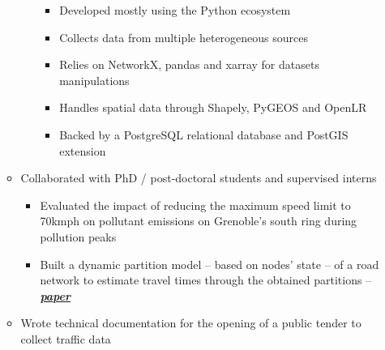 \documentclass{article}
\begin{document}
\begin{minipage}{0.8\textwidth}
\begin{flushleft}
\begin{itemize}
\begin{itemize}[leftmargin=*]
\begin{itemize}[leftmargin=*]
\begin{itemize}[leftmargin=*]
                \setlength\itemsep{.01cm}
                    \item Developed mostly using the Python ecosystem
                    \item Collects data from multiple heterogeneous sources
                    \item Relies on NetworkX, pandas and xarray for datasets manipulations
                    \item Handles spatial data through Shapely, PyGEOS and OpenLR
                    \item Backed by a PostgreSQL relational database and PostGIS extension
                \end{itemize}
            \end{itemize}
            \item Collaborated with PhD / post-doctoral students and supervised interns
                \vspace{-.15cm}
                \begin{itemize}[leftmargin=*]
                \setlength\itemsep{.01cm}
                    \item Evaluated the impact of reducing the maximum speed limit to 70kmph on pollutant emissions on Grenoble’s south ring during pollution peaks
                    \item Built a dynamic partition model – based on nodes’ state – of a road network to estimate travel times through the obtained partitions – \textbf{\textit{\hyperlink{https://hal.archives-ouvertes.fr/hal-01953560}{paper}}}
                \end{itemize}
            \item Wrote technical documentation for the opening of a public tender to collect traffic data
        \end{itemize}
    \end{itemize}
\end{flushleft}
\end{minipage}
\hfill\vline\hfill
\end{document}
